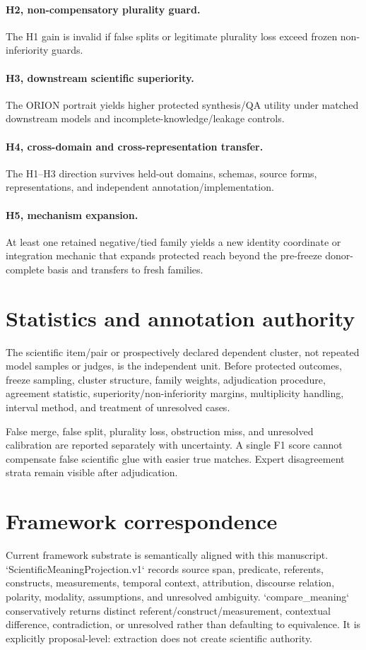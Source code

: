\documentclass[11pt]{article}
\begin{document}
\paragraph{H2, non-compensatory plurality guard.}
The H1 gain is invalid if false splits or legitimate plurality loss exceed frozen non-inferiority guards.

\paragraph{H3, downstream scientific superiority.}
The ORION portrait yields higher protected synthesis/QA utility under matched downstream models and incomplete-knowledge/leakage controls.

\paragraph{H4, cross-domain and cross-representation transfer.}
The H1--H3 direction survives held-out domains, schemas, source forms, representations, and independent annotation/implementation.

\paragraph{H5, mechanism expansion.}
At least one retained negative/tied family yields a new identity coordinate or integration mechanic that expands protected reach beyond the pre-freeze donor-complete basis and transfers to fresh families.

\section{Statistics and annotation authority}
The scientific item/pair or prospectively declared dependent cluster, not repeated model samples or judges, is the independent unit. Before protected outcomes, freeze sampling, cluster structure, family weights, adjudication procedure, agreement statistic, superiority/non-inferiority margins, multiplicity handling, interval method, and treatment of unresolved cases.

False merge, false split, plurality loss, obstruction miss, and unresolved calibration are reported separately with uncertainty. A single F1 score cannot compensate false scientific glue with easier true matches. Expert disagreement strata remain visible after adjudication.

\section{Framework correspondence}
Current framework substrate is semantically aligned with this manuscript. `ScientificMeaningProjection.v1` records source span, predicate, referents, constructs, measurements, temporal context, attribution, discourse relation, polarity, modality, assumptions, and unresolved ambiguity. `compare_meaning` conservatively returns distinct referent/construct/measurement, contextual difference, contradiction, or unresolved rather than defaulting to equivalence. It is explicitly proposal-level: extraction does not create scientific authority.
\end{document}
